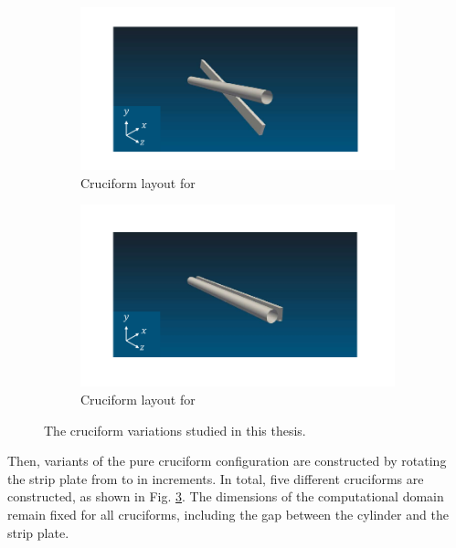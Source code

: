 \documentclass[oneside]{utmthesis}
\begin{document}
\begin{figure} \continuedfloat
  \centering
  \begin{subfigure}[h]{1\textwidth}
    \includegraphics[width=\textwidth]{figs/cruciform225}
    \caption{Cruciform layout for \angtw{}}
    \label{fig:cruciform22.5}
  \end{subfigure}

  \begin{subfigure}[h]{1\textwidth}
    \includegraphics[width=\textwidth]{figs/cruciform00}
    \caption{Cruciform layout for \angon{}}
    \label{fig:cruciform00}
  \end{subfigure}

  \caption{The cruciform variations studied in this thesis.}\label{fig:cruciformLayouts}
\end{figure}

Then, variants of the pure cruciform configuration are constructed by rotating the strip plate from \angfi{} to \angon{} in \angtw{} increments. In total, five different cruciforms are constructed, as shown in Fig. \ref{fig:cruciformLayouts}. The dimensions of the computational domain remain fixed for all cruciforms, including the gap between the cylinder and the strip plate.
\end{document}
